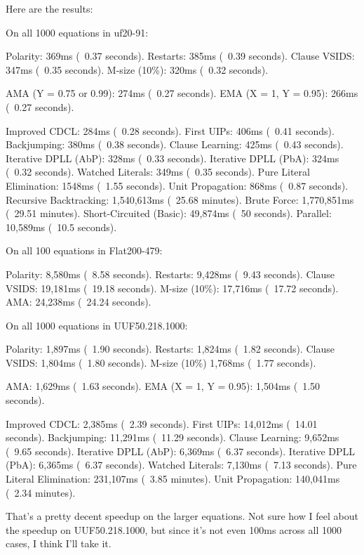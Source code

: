 Here are the results:
\begin{FVerbatim}
On all 1000 equations in uf20-91:

Polarity:                   369ms (~0.37 seconds).
Restarts:                   385ms (~0.39 seconds).
Clause VSIDS:               347ms (~0.35 seconds).
M-size (10\%):              320ms (~0.32 seconds).

AMA (Y = 0.75 or 0.99):     274ms (~0.27 seconds).
EMA (X = 1, Y = 0.95):      266ms (~0.27 seconds).

Improved CDCL:              284ms (~0.28 seconds).
First UIPs:                 406ms (~0.41 seconds).
Backjumping:                380ms (~0.38 seconds).
Clause Learning:            425ms (~0.43 seconds).
Iterative DPLL (AbP):       328ms (~0.33 seconds).
Iterative DPLL (PbA):       324ms (~0.32 seconds).
Watched Literals:           349ms (~0.35 seconds).
Pure Literal Elimination:   1548ms (~1.55 seconds).
Unit Propagation:           868ms (~0.87 seconds).
Recursive Backtracking:     1,540,613ms (~25.68 minutes).
Brute Force:                1,770,851ms (~29.51 minutes).
Short-Circuited (Basic):    49,874ms (~50 seconds).
Parallel:                   10,589ms (~10.5 seconds).

On all 100 equations in Flat200-479:

Polarity:                   8,580ms  (~8.58 seconds).
Restarts:                   9,428ms  (~9.43 seconds).
Clause VSIDS:               19,181ms (~19.18 seconds).
M-size (10\%):              17,716ms (~17.72 seconds).
AMA:                        24,238ms (~24.24 seconds).

On all 1000 equations in UUF50.218.1000:

Polarity:                   1,897ms (~1.90 seconds).
Restarts:                   1,824ms (~1.82 seconds).
Clause VSIDS:               1,804ms (~1.80 seconds).
M-size (10\%)               1,768ms (~1.77 seconds).

AMA:                        1,629ms (~1.63 seconds).
EMA (X = 1, Y = 0.95):      1,504ms (~1.50 seconds).

Improved CDCL:              2,385ms (~2.39 seconds).
First UIPs:                 14,012ms (~14.01 seconds).
Backjumping:                11,291ms (~11.29 seconds).
Clause Learning:            9,652ms (~9.65 seconds).
Iterative DPLL (AbP):       6,369ms (~6.37 seconds).
Iterative DPLL (PbA):       6,365ms (~6.37 seconds).
Watched Literals:           7,130ms (~7.13 seconds).
Pure Literal Elimination:   231,107ms (~3.85 minutes).
Unit Propagation:           140,041ms (~2.34 minutes).
\end{FVerbatim}
\noindent
That's a pretty decent speedup on the larger equations. Not sure how I feel 
about the speedup on UUF50.218.1000, but since it's not even 100ms across all 
1000 cases, I think I'll take it.